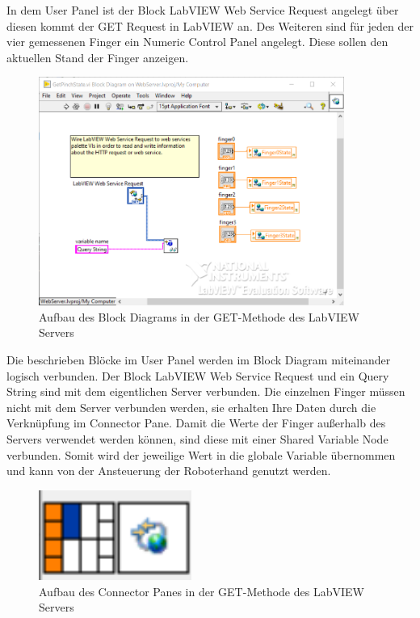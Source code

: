 \documentclass[a4paper,12pt,final]{article} %
\numberwithin{equation}{section} %
\numberwithin{figure}{section} %
\numberwithin{table}{section} %
\begin{document}
In dem User Panel ist der Block LabVIEW Web Service Request angelegt über diesen kommt der GET Request in LabVIEW an.
Des Weiteren sind für jeden der vier ge\-mes\-sen\-en Finger ein Numeric Control Panel angelegt. Diese sollen den aktuellen Stand der Finger anzeigen.
\begin{figure}[H]
	\begin{center}
		\includegraphics[width=10cm]{Bilder/BlockDiagram.png}
		\caption{Aufbau des Block Diagrams in der GET-Methode des LabVIEW Servers}
		\label{fig:LabVIEWBlockDia}
	\end{center}
\end{figure}
Die beschrieben Blöcke im User Panel werden im Block Diagram miteinander logisch verbunden.
Der Block LabVIEW Web Service Request und ein Query String sind mit dem eigentlichen Server verbunden. Die einzelnen Finger müssen nicht mit dem Server verbunden werden, sie erhalten Ihre Daten durch die Verknüpfung im Connector Pane.
Damit die Werte der Finger außerhalb des Servers verwendet werden können, sind diese mit einer Shared Variable Node verbunden. Somit wird der jeweilige Wert in die globale Variable übernommen und kann von der Ansteuerung der Roboterhand genutzt werden.  
\begin{figure}[H]
	\begin{center}
		\includegraphics[width=5cm]{Bilder/ConnectorPane.png}
		\caption{Aufbau des Connector Panes in der GET-Methode des LabVIEW Servers}
		\label{fig:LabVIEWConnectorPane}
	\end{center}
\end{figure}  
\end{document}
